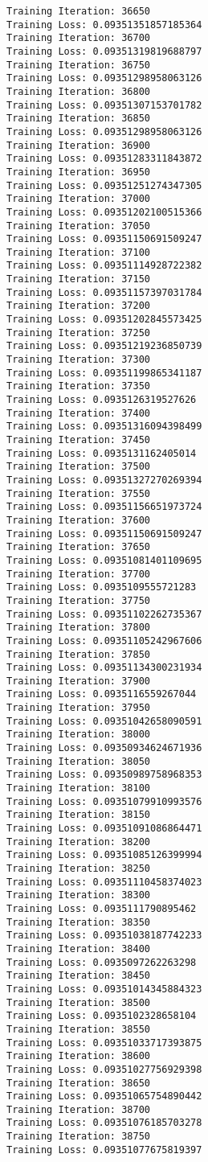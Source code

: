 \documentclass[11pt]{article}
\begin{document}
\begin{Verbatim}[commandchars=\\\{\}]
Training Iteration: 36650
Training Loss: 0.09351351857185364
Training Iteration: 36700
Training Loss: 0.09351319819688797
Training Iteration: 36750
Training Loss: 0.09351298958063126
Training Iteration: 36800
Training Loss: 0.09351307153701782
Training Iteration: 36850
Training Loss: 0.09351298958063126
Training Iteration: 36900
Training Loss: 0.09351283311843872
Training Iteration: 36950
Training Loss: 0.09351251274347305
Training Iteration: 37000
Training Loss: 0.09351202100515366
Training Iteration: 37050
Training Loss: 0.09351150691509247
Training Iteration: 37100
Training Loss: 0.09351114928722382
Training Iteration: 37150
Training Loss: 0.09351157397031784
Training Iteration: 37200
Training Loss: 0.09351202845573425
Training Iteration: 37250
Training Loss: 0.09351219236850739
Training Iteration: 37300
Training Loss: 0.09351199865341187
Training Iteration: 37350
Training Loss: 0.0935126319527626
Training Iteration: 37400
Training Loss: 0.09351316094398499
Training Iteration: 37450
Training Loss: 0.0935131162405014
Training Iteration: 37500
Training Loss: 0.09351327270269394
Training Iteration: 37550
Training Loss: 0.09351156651973724
Training Iteration: 37600
Training Loss: 0.09351150691509247
Training Iteration: 37650
Training Loss: 0.09351081401109695
Training Iteration: 37700
Training Loss: 0.0935109555721283
Training Iteration: 37750
Training Loss: 0.09351102262735367
Training Iteration: 37800
Training Loss: 0.09351105242967606
Training Iteration: 37850
Training Loss: 0.09351134300231934
Training Iteration: 37900
Training Loss: 0.0935116559267044
Training Iteration: 37950
Training Loss: 0.09351042658090591
Training Iteration: 38000
Training Loss: 0.09350934624671936
Training Iteration: 38050
Training Loss: 0.09350989758968353
Training Iteration: 38100
Training Loss: 0.09351079910993576
Training Iteration: 38150
Training Loss: 0.09351091086864471
Training Iteration: 38200
Training Loss: 0.09351085126399994
Training Iteration: 38250
Training Loss: 0.09351110458374023
Training Iteration: 38300
Training Loss: 0.0935111790895462
Training Iteration: 38350
Training Loss: 0.09351038187742233
Training Iteration: 38400
Training Loss: 0.0935097262263298
Training Iteration: 38450
Training Loss: 0.09351014345884323
Training Iteration: 38500
Training Loss: 0.0935102328658104
Training Iteration: 38550
Training Loss: 0.09351033717393875
Training Iteration: 38600
Training Loss: 0.09351027756929398
Training Iteration: 38650
Training Loss: 0.09351065754890442
Training Iteration: 38700
Training Loss: 0.09351076185703278
Training Iteration: 38750
Training Loss: 0.09351077675819397

\end{Verbatim}
\end{document}
